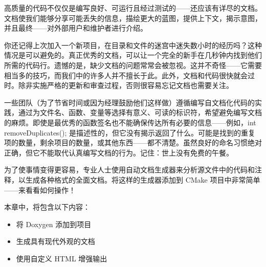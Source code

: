 高质量的代码不仅仅是编写良好、可运行且经过测试的——还应该有详尽的文档。文档使我们能够分享可能丢失的信息，描绘更大的蓝图，提供上下文，揭示意图，并且最终——对外部用户和维护者进行介绍。

你还记得上次加入一个新项目，在目录和文件的迷宫中迷失数小时的经历吗？这种情况是可以避免的。真正优秀的文档，可以让一个完全的新手在几秒钟内找到他们所需的代码行。遗憾的是，缺少文档的问题常常会被忽视。这并不奇怪——它需要相当多的技巧，而我们中的许多人并不擅长于此。此外，文档和代码很快就会过时。除非实施严格的更新和审查过程，否则很容易忘记文档也需要关注。

一些团队（为了节省时间或因为经理鼓励他们这样做）遵循编写自文档化代码的实践，通过为文件名、函数、变量等选择有意义、可读的标识符，希望避免编写文档的麻烦。即使是最优秀的函数签名也不能确保传达所有必要的信息——例如，int removeDuplicates(); 是描述性的，但它没有揭示返回了什么。可能是找到的重复项的数量，剩余项目的数量，或其他东西——都不清楚。虽然良好的命名习惯绝对正确，但它不能取代认真编写文档的行为。记住：世上没有免费的午餐。

为了使事情变得更容易，专业人士使用自动文档生成器来分析源文件中的代码和注释，以生成各种格式的全面文档。将这样的生成器添加到 CMake 项目中非常简单——来看看如何操作！

本章中，将包含以下内容：

\begin{itemize}
\item
将 Doxygen 添加到项目

\item
生成具有现代外观的文档

\item
使用自定义 HTML 增强输出
\end{itemize}
